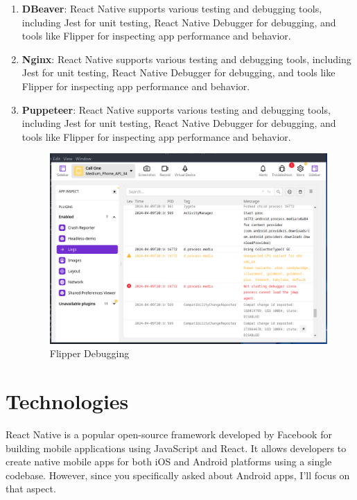 \begin{enumerate}
  \item \textbf{DBeaver}: React Native supports various testing and debugging tools, including Jest for unit testing, React Native Debugger for debugging, and tools like Flipper for inspecting app performance and behavior. 

  \item \textbf{Nginx}: React Native supports various testing and debugging tools, including Jest for unit testing, React Native Debugger for debugging, and tools like Flipper for inspecting app performance and behavior. 

  \item \textbf{Puppeteer}: React Native supports various testing and debugging tools, including Jest for unit testing, React Native Debugger for debugging, and tools like Flipper for inspecting app performance and behavior. 
  
  \begin{figure}
    \centering
    \includegraphics[width=1\linewidth]{Media//Chapter 6/flipper.png}
    \caption{Flipper Debugging}
    \label{fig:Flipper Debugging}
  \end{figure}
\end{enumerate}


\section{Technologies}
\justify

React Native is a popular open-source framework developed by Facebook for building mobile applications using JavaScript and React. It allows developers to create native mobile apps for both iOS and Android platforms using a single codebase. However, since you specifically asked about Android apps, I'll focus on that aspect.


